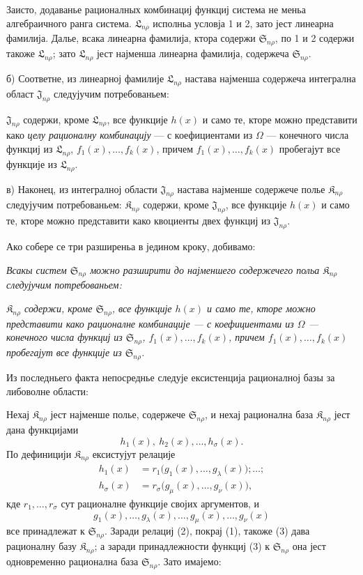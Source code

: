 ﻿\documentclass[11pt]{article}
\providecommand{\Kfield}{\mathfrak{K}}
\providecommand{\Ssys}{\mathfrak{S}}
\providecommand{\Jdom}{\mathfrak{J}}
\providecommand{\Lsys}{\mathfrak{L}}
\begin{document}
Заисто, додаванье рационалных комбинациј функциј система не меньа алгебраичного ранга система. $\Lsys_{n\rho}$ исполньа условја 1 и 2, зато јест линеарна фамилија. Далье, всака линеарна фамилија, ктора содержи $\Ssys_{n\rho}$, по 1 и 2 содержи такоже $\Lsys_{n\rho}$; зато $\Lsys_{n\rho}$ јест најменша линеарна фамилија, содержеча $\Ssys_{n\rho}$.

б) Соответне, из линеарној фамилије $\Lsys_{n\rho}$ настава најменша содержеча интегрална област $\Jdom_{n\rho}$ следујучим потребованьем:

$\Jdom_{n\rho}$ содержи, кроме $\Lsys_{n\rho}$, все функције $h(x)$ и само те, кторе можно представити како {\itshape целу рационалну комбинацију} --- с коефициентами из $\Omega$ --- конечного числа функциј из $\Lsys_{n\rho}$, $f_1(x),\ldots,f_k(x)$, причем $f_1(x),\ldots,f_k(x)$ пробегајут все функције из $\Lsys_{n\rho}$.

в) Наконец, из интегралној области $\Jdom_{n\rho}$ настава најменше содержече полье $\Kfield_{n\rho}$ следујучим потребованьем: $\Kfield_{n\rho}$ содержи, кроме $\Jdom_{n\rho}$, все функције $h(x)$ и само те, кторе можно представити како квоциенты двех функциј из $\Jdom_{n\rho}$.

Ако собере се три разширеньа в једином кроку, добивамо:

{\itshape Всакы систем $\Ssys_{n\rho}$ можно разширити до најменшего содержечего польа $\Kfield_{n\rho}$ следујучим потребованьем:}

{\itshape $\Kfield_{n\rho}$ содержи, кроме $\Ssys_{n\rho}$, все функције $h(x)$ и само те, кторе можно представити како рационалне комбинације --- с коефициентами из $\Omega$ --- конечного числа функциј из $\Ssys_{n\rho}$, $f_1(x),\ldots,f_k(x)$, причем $f_1(x),\ldots,f_k(x)$ пробегајут все функције из $\Ssys_{n\rho}$.}

Из последньего факта непосреднье следује ексистенција рационалној базы за либоволне области:

Нехај $\Kfield_{n\rho}$ јест најменше полье, содержече $\Ssys_{n\rho}$, и нехај рационална база $\Kfield_{n\rho}$ јест дана функцијами
\begin{equation}
  h_1(x),\ h_2(x),\ldots,h_\sigma(x).
\tag{1}
\end{equation}
По дефиницији $\Kfield_{n\rho}$ ексистујут релације
\begin{equation}
\begin{aligned}
 h_1(x)&=r_1\bigl(g_1(x),\ldots,g_\lambda(x)\bigr);\ldots;\\
 h_\sigma(x)&=r_\sigma\bigl(g_\mu(x),\ldots,g_\nu(x)\bigr),
\end{aligned}
\tag{2}
\end{equation}
кде $r_1,\ldots,r_\sigma$ сут рационалне функције својих аргументов, и
\begin{equation}
  g_1(x),\ldots,g_\lambda(x),\ldots,
  g_\mu(x),\ldots,g_\nu(x)
\tag{3}
\end{equation}
все принадлежат к $\Ssys_{n\rho}$. Заради релациј (2), покрај (1), такоже (3) дава рационалну базу $\Kfield_{n\rho}$; а заради принадлежности функциј (3) к $\Ssys_{n\rho}$ она јест одновременно рационална база $\Ssys_{n\rho}$. Зато имајемо:
\end{document}
